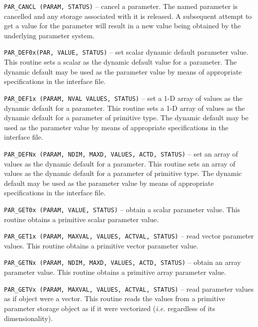 \documentclass[twoside,11pt,nolof]{starlink}
\begin{document}
\begin{description}

\item\texttt{PAR\_CANCL (PARAM, STATUS)}
 -- cancel a parameter.
The named parameter is cancelled and any storage associated
with it is released. A subsequent attempt to get a value for the
parameter will result in a new value being obtained by the
underlying parameter system.

\item\texttt{PAR\_DEF0x(PAR, VALUE, STATUS)}
-- set scalar dynamic default parameter value.
This routine sets a scalar as the dynamic default value for a
parameter. The dynamic default may be used as the parameter
value by means of appropriate specifications in the interface file.

\item\texttt{PAR\_DEF1x (PARAM, NVAL VALUES, STATUS)}
-- set a 1-D array of values as the dynamic default for a parameter.
This routine sets a 1-D array of values as the dynamic default for
a parameter of primitive type. The dynamic default may be used as
the parameter value by  means of appropriate specifications in the interface
file.


\item\texttt{PAR\_DEFNx (PARAM, NDIM, MAXD, VALUES, ACTD, STATUS)}
-- set an array of values as the dynamic default for a parameter.
This routine sets an array of values as the dynamic default for
a parameter of primitive type. The dynamic default may be used
as the parameter value by  means of appropriate specifications in the
interface file.


\item\texttt{PAR\_GET0x (PARAM, VALUE, STATUS)}
-- obtain a scalar parameter value.
This routine obtains a primitive scalar parameter value.


\item\texttt{PAR\_GET1x (PARAM, MAXVAL, VALUES, ACTVAL, STATUS)}
-- read vector parameter values.
This routine obtains a primitive vector parameter value.


\item\texttt{PAR\_GETNx (PARAM, NDIM, MAXD, VALUES, ACTD, STATUS)}
-- obtain an array parameter value.
This routine obtains a primitive array parameter value.



\item\texttt{PAR\_GETVx (PARAM, MAXVAL, VALUES, ACTVAL, STATUS)}
-- read parameter values as if object were a vector.
This routine reads the values from a primitive parameter storage
object as if it were vectorized (\textit{i.e.} regardless of its dimensionality).


\end{description}
\end{document}
